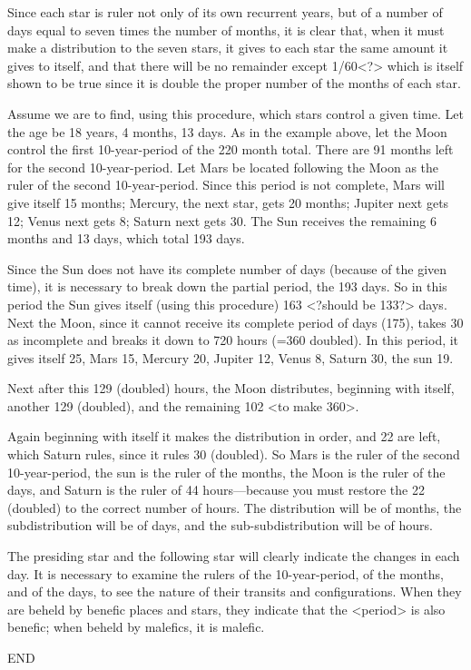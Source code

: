 Since each star is ruler not only of its own recurrent years, but of a number of days equal to seven times the number of months, it is clear that, when it must make a distribution to the seven stars, it gives to each star the same amount it gives to itself, and that there will be no remainder except 1/60<?> which is itself shown to be true since it is double the proper number of the months of each star.

Assume we are to find, using this procedure, which stars control a given time. Let the age be 18 years, 4 months, 13 days. As in the example above, let the Moon control the first 10-year-period of the
220 month total. There are 91 months left for the second 10-year-period. Let Mars be located following the Moon as the ruler of the second 10-year-period. Since this period is not complete, Mars will give itself 15 months; Mercury, the next star, gets 20 months; Jupiter next gets 12; Venus next gets 8; Saturn next gets 30. The Sun receives the remaining 6 months and 13 days, which total 193 days. 

Since the Sun does not have its complete number of days (because of the given time), it is necessary to break down the partial period, the 193 days. So in this period the Sun gives itself (using this procedure) 163 <?should be 133?> days. Next the Moon, since it cannot receive its complete period of days (175), takes 30 as incomplete and breaks it down to 720 hours (=360 doubled). In this period, it gives itself 25, Mars 15, Mercury 20, Jupiter 12, Venus 8, Saturn 30, the sun 19. 

Next after this 129 (doubled) hours, the Moon distributes, beginning with itself, another 129 (doubled), and the remaining 102 <to make 360>. 

Again beginning with itself it makes the distribution in order, and 22 are left, which Saturn rules, since it rules 30 (doubled). So Mars is the ruler of the second 10-year-period, the sun is the ruler of the months, the Moon is the ruler of the days, and Saturn is the ruler of 44 hours—because you must restore the 22 (doubled) to the correct number of hours. The distribution will be of months, the subdistribution will be of days, and the sub-subdistribution will be of hours.

The presiding star and the following star will clearly indicate the changes in each day. It is necessary to examine the rulers of the 10-year-period, of the months, and of the days, to see the nature of their transits and configurations. When they are beheld by benefic places and stars, they indicate that the <period> is also benefic; when beheld by malefics, it is malefic.

END



\newpage